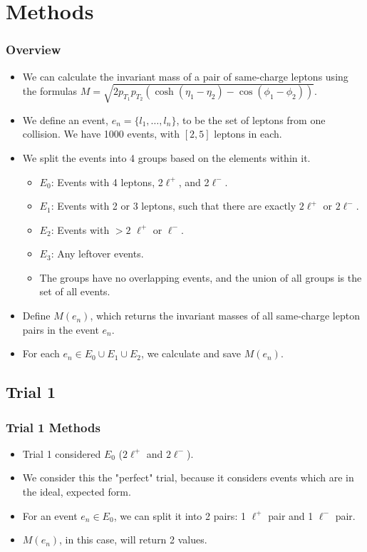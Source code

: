 \documentclass{beamer}
\begin{document}
\section{Methods}
\begin{frame}
\frametitle{Overview}
\begin{itemize}
    \item<1-> We can calculate the invariant mass of a pair of same-charge leptons using the formulas $M=\sqrt{2p_{T_1}p_{T_2}(\cosh(\eta_1-\eta_2)-\cos(\phi_1-\phi_2))}$.
    \item<2-> We define an event, $e_n=\{l_1,\dots,l_n\}$, to be the set of leptons from one collision. We have 1000 events, with $[2,5]$    leptons in each.
    \item<3-> We split the events into 4 groups based on the elements within it.
    \begin{itemize}
        \item<4-> $E_0$: Events with 4 leptons, 2$\ell^+$, and 2$\ell^-$.
        \item<5-> $E_1$: Events with 2 or 3 leptons, such that there are exactly $2\ell^+$ or $2\ell^-$.
        \item<6-> $E_2$: Events with $>2$ $\ell^+$ or $\ell^-$. 
        \item<7-> $E_3$: Any leftover events.
        \item<8-> The groups have no overlapping events, and the union of all groups is the set of all events.
    \end{itemize}
    \item<9-> Define $M(e_n)$, which returns the invariant masses of all same-charge lepton pairs in the event $e_n$.
    \item<10-> For each $e_n\in E_0\cup E_1\cup E_2$, we calculate and save $M(e_n)$.
\end{itemize}
\end{frame}

\subsection{Trial 1}
\begin{frame}
\frametitle{Trial 1 Methods}
\begin{itemize}
\item<1-> Trial 1 considered $E_0$ ($2\ell^+$ and $2\ell^-$).
\item<2-> We consider this the "perfect" trial, because it considers events which are in the ideal, expected form.
\item<3-> For an event $e_n\in E_0$, we can split it into 2 pairs: 1 $\ell^+$ pair and 1 $\ell^-$ pair.
\item<4-> $M(e_n)$, in this case, will return 2 values.
\end{itemize}
\end{frame}
\end{document}
